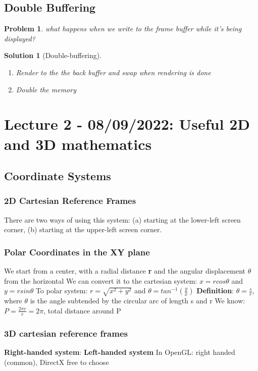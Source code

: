 \documentclass[11pt]{article}
\newtheorem{problem}[theorem]{Problem}
\newtheorem{solution}[theorem]{Solution}
\begin{document}
\subsection{Double Buffering}
\begin{problem}
    what happens when we write to the frame buffer while it's being displayed?
\end{problem}
\begin{solution}[Double-buffering]
    \begin{enumerate}
        \item Render to the the back buffer and swap when rendering is done
        \item Double the memory
    \end{enumerate}
\end{solution}

\section{Lecture 2 - 08/09/2022: Useful 2D and 3D mathematics}
\subsection{Coordinate Systems}
\subsubsection{2D Cartesian Reference Frames}
There are two ways of using this system: (a) starting at the lower-left screen corner, (b) starting at the upper-left screen corner. 

\subsubsection{Polar Coordinates in the XY plane}
We start from a center, with a radial distance \textbf{r} and the angular displacement $\theta$   from the horizontal   
\newline
We can convert it to the cartesian system: $x = r cos \theta$ and $y = r sin \theta$ 
\newline
To polar system: $r = \sqrt{x^2 + y^2}$ and $ \theta = tan^{-1}(\frac{y}{x})$    
\newline
\textbf{Definition}: $\theta = \frac{s}{r}$, where $\theta$ is the angle subtended by the circular arc of length s and r
\newline
We know: $P = \frac{2\pi r}{r} = 2\pi$, total distance around P
\subsubsection{3D cartesian reference frames}
\textbf{Right-handed system}: %
\newline 
\textbf{Left-handed system} %
\newline
In OpenGL: right handed (common), DirectX free to choose   
\end{document}
